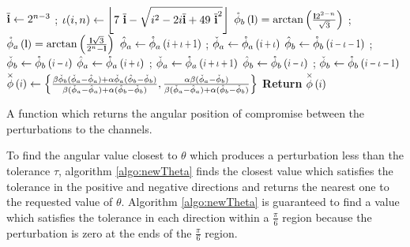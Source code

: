  \begin{algorithm}[h]
 \begin{algorithmic}
       
       \State $\overline{\mathbf{i}} \gets  2^{n-3}$  ; \quad  $\iota(i,n)  \gets  \left\lfloor 7\ \meanIndx-\sqrt{i^2 - 2 i \meanIndx + 49\ \meanIndx^2 }\right\rfloor $  
        \State $\extremaTheta{b}{\mathbf{l} } = \arctan\left(\frac{\mathbf{l} 2^{2-n}}{\sqrt{3}}       \right)$ ; \quad 
        $\extremaTheta{a}{\mathbf{l} } = \arctan\left(\frac{\mathbf{l} \sqrt{3} }{2^n - \mathbf{l}}\right)$
          
               \State   $\maximaTheta{a} \gets \extremaTheta{a}{i+\iota+1}  $ ;\quad
                 $\minimaTheta{a}  \gets \extremaTheta{a}{i+\iota} $ 
               \State   $\maximaTheta{b} \gets \extremaTheta{b}{i-\iota-1} $ ;\quad
                 $\minimaTheta{b}  \gets \extremaTheta{b}{i-\iota}  $
         \Else
                \State  $\maximaTheta{a}  \gets \extremaTheta{a}{i+\iota} $ ;\quad
                 $\minimaTheta{a}  \gets \extremaTheta{a}{i+\iota+1}  $ \;
                \State  $\maximaTheta{b} \gets \extremaTheta{b}{i-\iota}  $ ;\quad
                 $\minimaTheta{b}  \gets \extremaTheta{b} {i-\iota-1} $ \;
         \EndIf
       \State  $\thetaX{i} \gets \left\{\frac{
        \beta \minimaTheta{b} (\minimaTheta{a}  -\maximaTheta{a} )+\alpha  \minimaTheta{a} (\maximaTheta{b}-\minimaTheta{b})  }{
        \beta  (\minimaTheta{a} -\maximaTheta{a})+\alpha  (\maximaTheta{b}-\minimaTheta{b})
        },\frac{
        \alpha  \beta  (\minimaTheta{a}-\minimaTheta{b})  }{
        \beta  (\minimaTheta{a}-\maximaTheta{a})+\alpha  (\maximaTheta{b}-\minimaTheta{b})
        }\right\} $ \;
      \State \textbf{Return} {$\thetaX{i}$}
\EndFunction
 \end{algorithmic}
    \caption{A function which returns the angular position of compromise between the perturbations to the channels.}
    \label{algo:thetaX}
\end{algorithm}

To find the angular value closest to $\theta$ which produces a perturbation less than the tolerance $\tau$, algorithm \ref{algo:newTheta} finds the closest value which satisfies the tolerance in the positive and negative directions and returns the nearest one to the requested value of $\theta$. Algorithm \ref{algo:newTheta} is guaranteed to find a value which satisfies the tolerance in each direction within a $\frac{\pi}{6}$ region because the perturbation is zero at the ends of the $\frac{\pi}{6}$ region.
 
